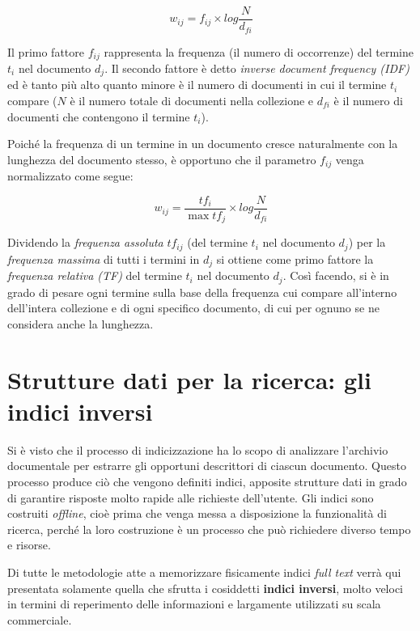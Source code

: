 \[ w_{ij} = f_{ij} \times log\frac{N}{d_{fi}} \]

Il primo fattore \(f_{ij}\) rappresenta la frequenza (il numero di occorrenze) del termine  \(t_{i}\) nel documento \(d_{j}\). \newline
Il secondo fattore è detto \textit{inverse document frequency (IDF)} ed è tanto più alto quanto minore è il numero di documenti in cui il termine \(t_{i}\) compare (\(N\) è il numero totale di documenti nella collezione e \(d_{fi}\) è il numero di documenti che contengono il termine \(t_{i}\)).

Poiché la frequenza di un termine in un documento cresce naturalmente con la lunghezza del documento stesso, è opportuno che il parametro \(f_{ij}\) venga normalizzato come segue:

\[ w_{ij} = \frac{tf_{i}}{\max tf_{j}} \times log\frac{N}{d_{fi}} \]

\vspace{1em}
Dividendo la \textit{frequenza assoluta} \(tf_{ij}\) (del termine \(t_{i}\) nel documento \(d_{j}\)) per la \textit{frequenza massima} di tutti i termini in \(d_{j}\) si ottiene come primo fattore la \textit{frequenza relativa (TF)} del termine \(t_{i}\) nel documento \(d_{j}\).
Così facendo, si è in grado di pesare ogni termine sulla base della frequenza cui compare all’interno dell’intera collezione e di ogni specifico documento, di cui per ognuno se ne considera anche la lunghezza.



\section{Strutture dati per la ricerca: gli indici inversi}

Si è visto che il processo di indicizzazione ha lo scopo di analizzare l’archivio documentale per estrarre gli opportuni descrittori di ciascun documento. Questo processo produce ciò che vengono definiti indici, apposite strutture dati in grado di garantire risposte molto rapide alle richieste dell’utente. Gli indici sono costruiti \textit{offline}, cioè prima che venga messa a disposizione la funzionalità di ricerca, perché la loro costruzione è un processo che può richiedere diverso tempo e risorse.

\vspace{1em}

Di tutte le metodologie atte a memorizzare fisicamente indici \textit{full text} verrà qui presentata solamente quella che sfrutta i cosiddetti \textbf{indici inversi}, molto veloci in termini di reperimento delle informazioni e largamente utilizzati su scala commerciale.


